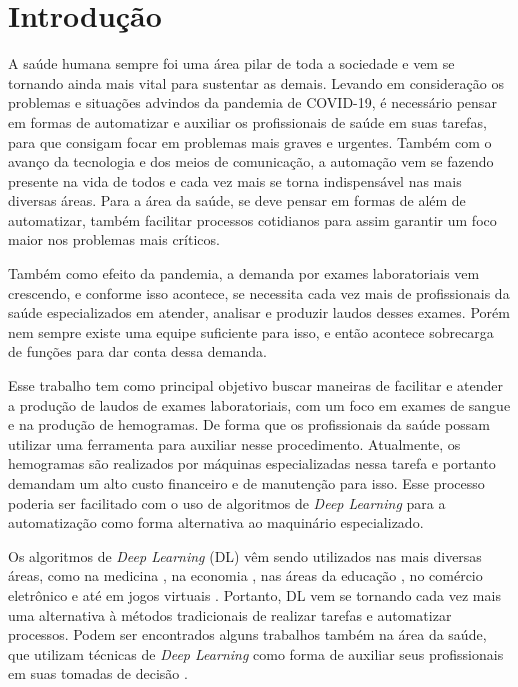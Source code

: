 \chapter{Introdução}
\label{chap:introducao}

A saúde humana sempre foi uma área pilar de toda a sociedade e vem se tornando ainda mais vital para sustentar as demais. Levando em consideração os problemas e situações advindos da pandemia de COVID-19, é necessário pensar em formas de automatizar e auxiliar os profissionais de saúde em suas tarefas, para que consigam focar em problemas mais graves e urgentes. Também com o avanço da tecnologia e dos meios de comunicação, a automação vem se fazendo presente na vida de todos e cada vez mais se torna indispensável nas mais diversas áreas. Para a área da saúde, se deve pensar em formas de além de automatizar, também facilitar processos cotidianos para assim garantir um foco maior nos problemas mais críticos.

Também como efeito da pandemia, a demanda por exames laboratoriais vem crescendo, e conforme isso acontece, se necessita cada vez mais de profissionais da saúde especializados em atender, analisar e produzir laudos desses exames. Porém nem sempre existe uma equipe suficiente para isso, e então acontece sobrecarga de funções para dar conta dessa demanda.

Esse trabalho tem como principal objetivo buscar maneiras de facilitar e atender a produção de laudos de exames laboratoriais, com um foco em exames de sangue e na produção de hemogramas. De forma que os profissionais da saúde possam utilizar uma ferramenta para auxiliar nesse procedimento. Atualmente, os hemogramas são realizados por máquinas especializadas nessa tarefa e portanto demandam um alto custo financeiro e de manutenção para isso. Esse processo poderia ser facilitado com o uso de algoritmos de \emph{Deep Learning} para a automatização como forma alternativa ao maquinário especializado.

Os algoritmos de \emph{Deep Learning} (DL) vêm sendo utilizados nas mais diversas áreas, como na medicina \cite{deepMedicine}, na economia \cite{deepEconomy}, nas áreas da educação \cite{deepEducation}, no comércio eletrônico \cite{deepEcommerce} e até em jogos virtuais \cite{deepGaming}. Portanto, DL vem se tornando cada vez mais uma alternativa à métodos tradicionais de realizar tarefas e automatizar processos. Podem ser encontrados alguns trabalhos também na área da saúde, que utilizam técnicas de \emph{Deep Learning} como forma de auxiliar seus profissionais em suas tomadas de decisão \cite{deepHealth1} \cite{deepHealth2}.

